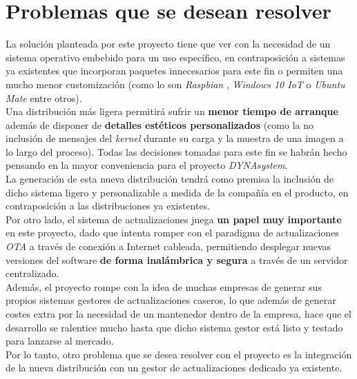 \section{Problemas que se desean resolver}

La solución planteada por este proyecto tiene que ver con la necesidad de un sistema operativo embebido para un uso específico, en contraposición a sistemas ya existentes que incorporan paquetes innecesarios para este fin o permiten una mucho menor customización (como lo son \textit{Raspbian} \cite{raspbian}, \textit{Windows 10 IoT} \cite{windows-10-iot} o \textit{Ubuntu Mate} \cite{ubuntu-mate-raspberry} entre otros).\\

Una distribución más ligera permitirá sufrir un \textbf{menor tiempo de arranque} además de disponer de \textbf{detalles estéticos personalizados} (como la no inclusión de mensajes del \textit{kernel} durante su carga y la muestra de una imagen a lo largo del proceso). Todas las decisiones tomadas para este fin se habrán hecho pensando en la mayor conveniencia para el proyecto \textit{DYNAsystem}.\\

La generación de esta nueva distribución tendrá como premisa la inclusión de dicho sistema ligero y personalizable a medida de la compañía en el producto, en contraposición a las distribuciones ya existentes.\\

Por otro lado, el sistema de actualizaciones juega \textbf{un papel muy importante} en este proyecto, dado que intenta romper con el paradigma de actualizaciones \textit{OTA} a través de conexión a Internet cableada, permitiendo desplegar nuevas versiones del software \textbf{de forma inalámbrica y segura} a través de un servidor centralizado.\\

Además, el proyecto rompe con la idea de muchas empresas de generar sus propios sistemas gestores de actualizaciones caseros, lo que además de generar costes extra por la necesidad de un mantenedor dentro de la empresa, hace que el desarrollo se ralentice mucho hasta que dicho sistema gestor está listo y testado para lanzarse al mercado.\\

Por lo tanto, otro problema que se desea resolver con el proyecto es la integración de la nueva distribución con un gestor de actualizaciones dedicado ya existente.

\newpage
